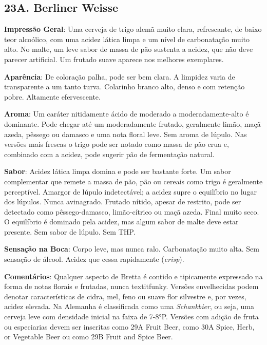 \subsection*{23A. Berliner Weisse}

\textbf{Impressão Geral}: Uma cerveja de trigo alemã muito clara, refrescante, de baixo teor alcoólico, com uma acidez lática limpa e um nível de carbonatação muito alto. No malte, um leve sabor de massa de pão sustenta a acidez, que não deve parecer artificial. Um frutado suave aparece nos melhores exemplares.

\textbf{Aparência}: De coloração palha, pode ser bem clara. A limpidez varia de transparente a um tanto turva. Colarinho branco alto, denso e com retenção pobre. Altamente efervescente.

\textbf{Aroma}: Um caráter nitidamente ácido de moderado a moderadamente-alto é dominante. Pode chegar até um moderadamente frutado, geralmente limão, maçã azeda, pêssego ou damasco e uma nota floral leve. Sem aroma de lúpulo. Nas versões mais frescas o trigo pode ser notado como massa de pão crua e, combinado com a acidez, pode sugerir pão de fermentação natural.

\textbf{Sabor}: Acidez lática limpa domina e pode ser bastante forte. Um sabor complementar que remete a massa de pão, pão ou cereais como trigo é geralmente perceptível. Amargor de lúpulo indetectável; a acidez supre o equilíbrio no lugar dos lúpulos. Nunca avinagrado. Frutado nítido, apesar de restrito, pode ser detectado como pêssego-damasco, limão-cítrico ou maçã azeda. Final muito seco. O equilíbrio é dominado pela acidez, mas algum sabor de malte deve estar presente. Sem sabor de lúpulo. Sem THP.

\textbf{Sensação na Boca}: Corpo leve, mas nunca ralo. Carbonatação muito alta. Sem sensação de álcool. Acidez que cessa rapidamente (\textit{crisp}).

\textbf{Comentários}: Qualquer aspecto de Bretta é contido e tipicamente expressado na forma de notas florais e frutadas, nunca textit{funky}. Versões envelhecidas podem denotar características de cidra, mel, feno ou suave flor silvestre e, por vezes, acidez elevada. Na Alemanha é classificada como uma \textit{Schankbier}, ou seja, uma cerveja leve com densidade inicial na faixa de 7-8°P. Versões com adição de fruta ou especiarias devem ser inscritas como 29A Fruit Beer, como 30A Spice, Herb, or Vegetable Beer ou como 29B Fruit and Spice Beer.

